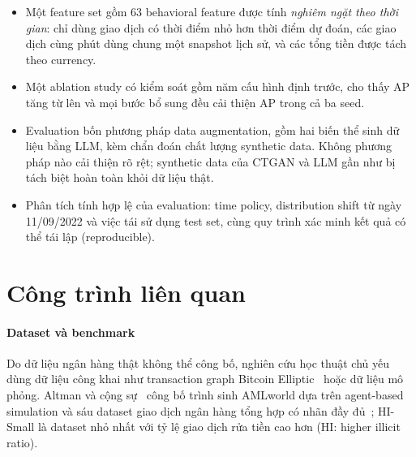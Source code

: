 \documentclass[sigconf,nonacm]{acmart}
\begin{document}
\begin{itemize}
  \item Một feature set gồm 63 behavioral feature được tính \emph{nghiêm ngặt theo thời gian}: chỉ dùng giao dịch có
  thời điểm nhỏ hơn thời điểm dự đoán, các giao dịch cùng phút dùng chung một snapshot lịch sử, và các tổng tiền được
  tách theo currency.
  \item Một ablation study có kiểm soát gồm năm cấu hình định trước, cho thấy AP tăng từ \FZeroAP{} lên \FFourAP{} và
  mọi bước bổ sung đều cải thiện AP trong cả ba seed.
  \item Evaluation bốn phương pháp data augmentation, gồm hai biến thể sinh dữ liệu bằng LLM, kèm chẩn đoán chất lượng
  synthetic data. Không phương pháp nào cải thiện rõ rệt; synthetic data của CTGAN và LLM gần như bị tách biệt hoàn
  toàn khỏi dữ liệu thật.
  \item Phân tích tính hợp lệ của evaluation: time policy, distribution shift từ ngày 11/09/2022 và việc tái sử dụng
  test set, cùng quy trình xác minh kết quả có thể tái lập (reproducible).
\end{itemize}

\section{Công trình liên quan}

\paragraph{Dataset và benchmark} Do dữ liệu ngân hàng thật không thể công bố, nghiên cứu học thuật chủ yếu dùng dữ
liệu công khai như transaction graph Bitcoin Elliptic~\cite{weber2019elliptic} hoặc dữ liệu mô phỏng. Altman và cộng
sự~\cite{altman2023realistic} công bố trình sinh AMLworld dựa trên agent-based simulation và sáu dataset giao dịch
ngân hàng tổng hợp có nhãn đầy đủ~\cite{ibmamlkaggle}; HI-Small là dataset nhỏ nhất với tỷ lệ giao dịch rửa tiền
cao hơn (HI: higher illicit ratio).
\end{document}
